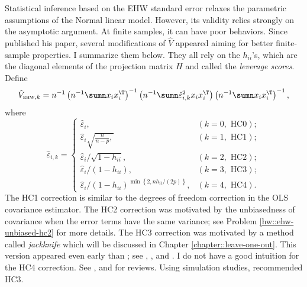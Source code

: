 Statistical inference based on the EHW standard error relaxes the parametric assumptions of the Normal linear model. However, its validity relies strongly on the asymptotic argument. At finite samples, it can have poor behaviors. 
Since \citet{white::1980} published his paper, several modifications of $\hat{V}$ appeared aiming for better finite-sample properties. I summarize them below. They all rely on the $h_{ii}$'s, which are the diagonal elements of the projection matrix $H$ and called the {\it leverage scores}. Define
\[
\hat{V}_{\textsc{ehw},k} = n^{-1}\left(n^{-1}\sumn x_{i}x_{i}^{\T}\right)^{-1}\left(n^{-1}\sumn\hat{\varepsilon}_{i,k}^{2}x_{i}x_{i}^{\T}\right)\left(n^{-1}\sumn x_{i}x_{i}^{\T}\right)^{-1},
\]
where  
\[
\hat{\varepsilon}_{i,k}=\begin{cases}
\hat{\varepsilon}_{i}, & (k=0, \text{ HC}0); \\
\hat{\varepsilon}_{i}\sqrt{\frac{n}{n-p},} & (k=1, \text{ HC}1) ; \\
\hat{\varepsilon}_{i}/\sqrt{1-h_{ii}}, & (k=2, \text{ HC}2) ; \\
\hat{\varepsilon}_{i}/(1-h_{ii}), & (k=3, \text{ HC}3); \\
\hat{\varepsilon}_{i}/(1-h_{ii})^{\min\left\{ 2,nh_{ii}/(2p)\right\} }, & (k=4, \text{ HC}4).
\end{cases}
\]
The HC1 correction is similar to the degrees of freedom correction in the OLS covariance estimator. The HC2 correction was motivated by the unbiasedness of covariance when the error terms have the same variance; see Problem \ref{hw::ehw-unbiased-hc2} for more details. The HC3 correction was motivated by a method called {\it jackknife} which will be discussed in Chapter \ref{chapter::leave-one-out}. This version appeared even early than  \citet{white::1980}; see \citet{miller1974unbalanced}, \citet{hinkley1977jackknifing}, and \citet{reeds1978jackknifing}. 
I do not have a good intuition for the HC4 correction. 
See \citet{mackinnon1985some}, \citet{long2000using} and \citet{cribari2004asymptotic} for reviews. Using simulation studies, \citet{long2000using} recommended HC3. 





